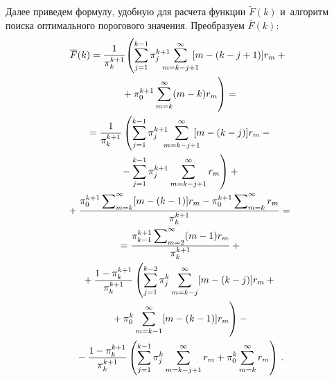 \begin{multicols}{2}
  Далее приведем формулу, удобную для расчета функции $\tilde{F}(k)$ 
и~алгоритм поиска оптимального порогового значения. Преобразуем $\overline{F}(k)$:
  \begin{multline*}
 \!\! \overline{F}(k)= \fr{1}{\pi_k^{k+1}}\!\left(\sum\limits_{j=1}^{k-1} \pi_j^{k+1}\!\!\!\!\!\!
   \sum\limits^\infty_{m=k-j+1} \!\!\!\!
[m-(k-j+1)]r_m +{}\right.\hspace*{-1.89pt}\\
\left.{}+\pi_0^{k+1}\sum\limits^\infty_{m=k} (m-
k)r_m
\vphantom{\sum\limits_{j=1}^{k-1}}\right)={}\\
  {}=\fr{1}{\pi_k^{k+1}}\left(\sum\limits_{j=1}^{k-1}\pi_j^{k+1} \!\!\!\!
  \sum\limits^\infty_{m=k-j+1} \!\!\!\!
[m-(k-j)]r_m -{}\right.\\
\left.{}-\sum\limits^{k-1}_{j=1}\pi_j^{k+1}\sum\limits^\infty_{m=k-
j+1} r_m\right)+{}\\
  {}+
  \fr{\pi_0^{k+1}\sum\nolimits^\infty_{m=k} [m-(k-1)]r_m -
\pi_0^{k+1}\sum\nolimits^\infty_{m=k} r_m}{\pi_k^{k+1}}={}\\
  {}=\fr{\pi_{k-1}^{k+1} \sum\nolimits^\infty_{m=2}  (m-
1)r_m}{\pi_k^{k+1}}+{}\\
  {}+ \fr{1-\pi_k^{k+1}}{\pi_k^{k+1}}
   \left(\sum\limits^{k-2}_{j=1}\pi_j^k 
\sum\limits^\infty_{m=k-j}[m-(k-j)]r_m +{}\right.\\
\left.{}+\pi_0^k \sum\limits^\infty_{m=k-1} 
[m-(k-1)]r_m
\vphantom{\sum\limits_{j=1}^{k-2}}\right)-{}\\
  {}-
\fr{1-\pi_k^{k+1}}{\pi_k^{k+1}}\left( \sum\limits_{j=1}^{k-1} \pi_j^k 
\sum\limits^\infty_{m=k-j+1} r_m +\pi_0^k \sum\limits^\infty_{m=k} 
r_m\right)\,.
  \end{multline*}
  \begin{figure*} %
 \vspace*{1pt}
 \begin{minipage}[t]{81mm}
\begin{center}
\mbox{%
\epsfxsize=76.495mm
}
\end{center}
\vspace*{-9pt}
\end{minipage}
\hfill
\vspace*{1pt}
 \begin{minipage}[t]{81mm}
\begin{center}
\mbox{%
\epsfxsize=76.495mm
}
\end{center}
\vspace*{-9pt}
\end{minipage}
\vspace*{3pt}
\end{figure*}
  

\end{multicols}
